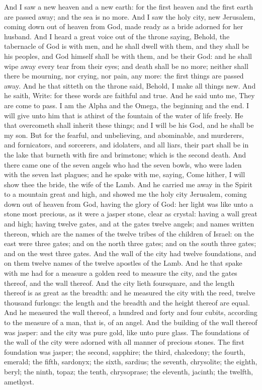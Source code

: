 And I saw a new heaven and a new earth: for the first heaven and the first earth are passed away; and the sea is no more. And I saw the holy city, new Jerusalem, coming down out of heaven from God, made ready as a bride adorned for her husband. And I heard a great voice out of the throne saying, Behold, the tabernacle of God is with men, and he shall dwell with them, and they shall be his peoples, and God himself shall be with them, and be their God: and he shall wipe away every tear from their eyes; and death shall be no more; neither shall there be mourning, nor crying, nor pain, any more: the first things are passed away. And he that sitteth on the throne said, Behold, I make all things new. And he saith, Write: for these words are faithful and true. And he said unto me, They are come to pass. I am the Alpha and the Omega, the beginning and the end. I will give unto him that is athirst of the fountain of the water of life freely. He that overcometh shall inherit these things; and I will be his God, and he shall be my son. But for the fearful, and unbelieving, and abominable, and murderers, and fornicators, and sorcerers, and idolaters, and all liars, their part shall be in the lake that burneth with fire and brimstone; which is the second death.  And there came one of the seven angels who had the seven bowls, who were laden with the seven last plagues; and he spake with me, saying, Come hither, I will show thee the bride, the wife of the Lamb. And he carried me away in the Spirit to a mountain great and high, and showed me the holy city Jerusalem, coming down out of heaven from God, having the glory of God: her light was like unto a stone most precious, as it were a jasper stone, clear as crystal: having a wall great and high; having twelve gates, and at the gates twelve angels; and names written thereon, which are the names of the twelve tribes of the children of Israel: on the east were three gates; and on the north three gates; and on the south three gates; and on the west three gates. And the wall of the city had twelve foundations, and on them twelve names of the twelve apostles of the Lamb. And he that spake with me had for a measure a golden reed to measure the city, and the gates thereof, and the wall thereof. And the city lieth foursquare, and the length thereof is as great as the breadth: and he measured the city with the reed, twelve thousand furlongs: the length and the breadth and the height thereof are equal. And he measured the wall thereof, a hundred and forty and four cubits, according to the measure of a man, that is, of an angel. And the building of the wall thereof was jasper: and the city was pure gold, like unto pure glass. The foundations of the wall of the city were adorned with all manner of precious stones. The first foundation was jasper; the second, sapphire; the third, chalcedony; the fourth, emerald; the fifth, sardonyx; the sixth, sardius; the seventh, chrysolite; the eighth, beryl; the ninth, topaz; the tenth, chrysoprase; the eleventh, jacinth; the twelfth, amethyst. 